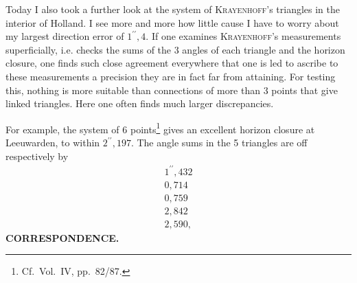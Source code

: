 Today I also took a further look at the system of \textsc{Krayenhoff}'s
triangles in the interior of Holland. I see more and more how little cause
I have to worry about my largest direction error of $1^{\prime\prime}{,}4$.
If one examines \textsc{Krayenhoff}'s measurements superficially, i.e. checks
the sums of the 3 angles of each triangle and the horizon closure, one finds
such close agreement everywhere that one is led to ascribe to these
measurements a precision they are in fact  far from attaining.
For testing this, nothing is more suitable than connections of more than 3
points that give linked triangles. Here one often finds much larger discrepancies.
\begin{center}
\end{center}
\begingroup
\makeatletter
\renewcommand{\@makefnmark}{\hbox{\normalfont[\textsuperscript{*})]}}
\renewcommand{\@makefntext}[1]{\parindent1em\noindent\hbox to1.8em{\hss[\textsuperscript{*})\ }#1]}
\makeatother
\noindent For example, the system of 6 points\footnote{Cf.\ Vol.\ IV,
pp.\ 82/87.} gives an excellent horizon closure at Leeuwarden, to within
$2^{\prime\prime}{,}197$. The angle sums in the 5 triangles are off respectively by
\[
\begin{array}{r}
1^{\prime\prime}{,}432\\
0{,}714\\
0{,}759\\
2{,}842\\
2{,}590,
\end{array}
\]
\endgroup
\makeatletter
\def\ps@gaussIXfortyone{\def\@oddhead{}\def\@evenhead{}\def\@oddfoot{\small IX.\hfil41}\let\@evenfoot\@oddfoot}
\makeatother
\thispagestyle{gaussIXfortyone}
\clearpage
{}\hfill\textbf{CORRESPONDENCE.}\par\medskip
